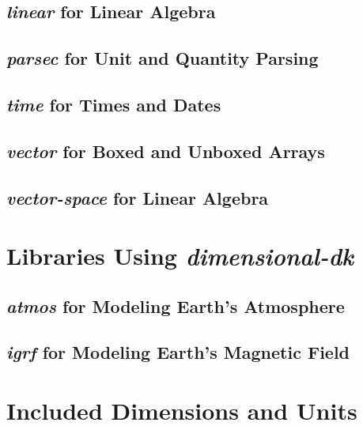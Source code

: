 \documentclass[12pt]{report}
\newcommand{\packagename}[1]{\textit{#1}}
\begin{document}
\section{\packagename{linear} for Linear Algebra}
\section{\packagename{parsec} for Unit and Quantity Parsing}
\section{\packagename{time} for Times and Dates}
\section{\packagename{vector} for Boxed and Unboxed Arrays}
\section{\packagename{vector-space} for Linear Algebra}

\chapter{Libraries Using \packagename{dimensional-dk}}

\section{\packagename{atmos} for Modeling Earth's Atmosphere}
\section{\packagename{igrf} for Modeling Earth's Magnetic Field}

\chapter{Included Dimensions and Units}
\end{document}
